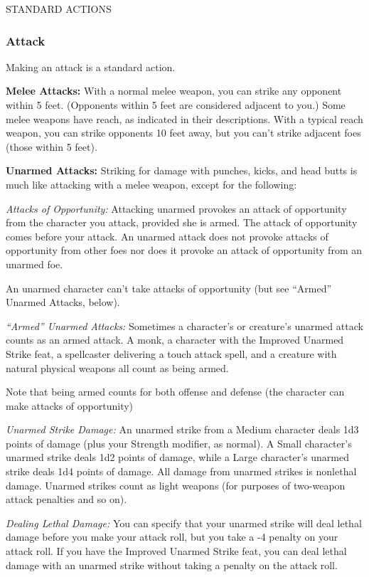 \documentclass{article}
\begin{document}
\vspace{12pt}
STANDARD ACTIONS

\subsubsection*{\textbf{Attack}}

Making an attack is a standard action.

\textbf{Melee Attacks: }With a normal melee weapon, you can strike any opponent 
within 5 feet. (Opponents within 5 feet are considered adjacent to you.) Some melee 
weapons have reach, as indicated in their descriptions. With a typical reach weapon, 
you can strike opponents 10 feet away, but you can't strike adjacent foes (those 
within 5 feet).

\textbf{Unarmed Attacks:} Striking for damage with punches, kicks, and head butts 
is much like attacking with a melee weapon, except for the following:

\textit{Attacks of Opportunity: }Attacking unarmed provokes an attack of opportunity 
from the character you attack, provided she is armed. The attack of opportunity 
comes before your attack. An unarmed attack does not provoke attacks of opportunity 
from other foes nor does it provoke an attack of opportunity from an unarmed foe.

An unarmed character can't take attacks of opportunity (but see ``Armed'' Unarmed 
Attacks, below).

\textit{``Armed'' Unarmed Attacks: }Sometimes a character's or creature's unarmed 
attack counts as an armed attack. A monk, a character with the Improved Unarmed 
Strike feat, a spellcaster delivering a touch attack spell, and a creature with 
natural physical weapons all count as being armed.

Note that being armed counts for both offense and defense (the character can make 
attacks of opportunity)

\textit{Unarmed Strike Damage: }An unarmed strike from a Medium character deals 
1d3 points of damage (plus your Strength modifier, as normal). A Small character's 
unarmed strike deals 1d2 points of damage, while a Large character's unarmed strike 
deals 1d4 points of damage. All damage from unarmed strikes is nonlethal damage. 
Unarmed strikes count as light weapons (for purposes of two-weapon attack penalties 
and so on).

\textit{Dealing Lethal Damage: }You can specify that your unarmed strike will deal 
lethal damage before you make your attack roll, but you take a -4 penalty on your 
attack roll. If you have the Improved Unarmed Strike feat, you can deal lethal 
damage with an unarmed strike without taking a penalty on the attack roll.
\end{document}
